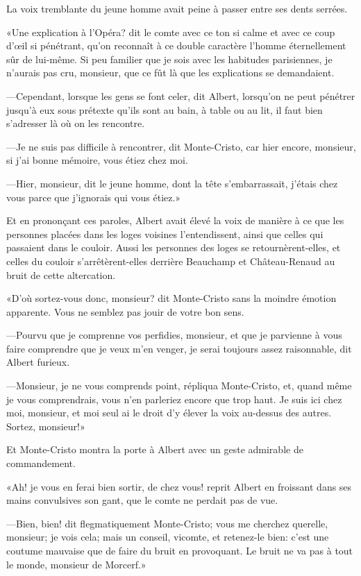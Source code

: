La voix tremblante du jeune homme avait peine à passer entre ses dents serrées. 

«Une explication à l'Opéra? dit le comte avec ce ton si calme et avec ce coup d'œil si pénétrant, qu'on reconnaît à ce double caractère l'homme éternellement sûr de lui-même. Si peu familier que je sois avec les habitudes parisiennes, je n'aurais pas cru, monsieur, que ce fût là que les explications se demandaient. 

—Cependant, lorsque les gens se font celer, dit Albert, lorsqu'on ne peut pénétrer jusqu'à eux sous prétexte qu'ils sont au bain, à table ou au lit, il faut bien s'adresser là où on les rencontre. 

—Je ne suis pas difficile à rencontrer, dit Monte-Cristo, car hier encore, monsieur, si j'ai bonne mémoire, vous étiez chez moi. 

—Hier, monsieur, dit le jeune homme, dont la tête s'embarrassait, j'étais chez vous parce que j'ignorais qui vous étiez.» 

Et en prononçant ces paroles, Albert avait élevé la voix de manière à ce que les personnes placées dans les loges voisines l'entendissent, ainsi que celles qui passaient dans le couloir. Aussi les personnes des loges se retournèrent-elles, et celles du couloir s'arrêtèrent-elles derrière Beauchamp et Château-Renaud au bruit de cette altercation. 

«D'où sortez-vous donc, monsieur? dit Monte-Cristo sans la moindre émotion apparente. Vous ne semblez pas jouir de votre bon sens. 

—Pourvu que je comprenne vos perfidies, monsieur, et que je parvienne à vous faire comprendre que je veux m'en venger, je serai toujours assez raisonnable, dit Albert furieux. 

—Monsieur, je ne vous comprends point, répliqua Monte-Cristo, et, quand même je vous comprendrais, vous n'en parleriez encore que trop haut. Je suis ici chez moi, monsieur, et moi seul ai le droit d'y élever la voix au-dessus des autres. Sortez, monsieur!» 

Et Monte-Cristo montra la porte à Albert avec un geste admirable de commandement. 

«Ah! je vous en ferai bien sortir, de chez vous! reprit Albert en froissant dans ses mains convulsives son gant, que le comte ne perdait pas de vue. 

—Bien, bien! dit flegmatiquement Monte-Cristo; vous me cherchez querelle, monsieur; je vois cela; mais un conseil, vicomte, et retenez-le bien: c'est une coutume mauvaise que de faire du bruit en provoquant. Le bruit ne va pas à tout le monde, monsieur de Morcerf.» 

